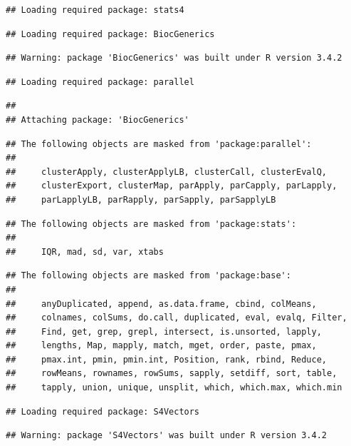 \documentclass[]{article}
\begin{document}
\begin{verbatim}
## Loading required package: stats4
\end{verbatim}

\begin{verbatim}
## Loading required package: BiocGenerics
\end{verbatim}

\begin{verbatim}
## Warning: package 'BiocGenerics' was built under R version 3.4.2
\end{verbatim}

\begin{verbatim}
## Loading required package: parallel
\end{verbatim}

\begin{verbatim}
## 
## Attaching package: 'BiocGenerics'
\end{verbatim}

\begin{verbatim}
## The following objects are masked from 'package:parallel':
## 
##     clusterApply, clusterApplyLB, clusterCall, clusterEvalQ,
##     clusterExport, clusterMap, parApply, parCapply, parLapply,
##     parLapplyLB, parRapply, parSapply, parSapplyLB
\end{verbatim}

\begin{verbatim}
## The following objects are masked from 'package:stats':
## 
##     IQR, mad, sd, var, xtabs
\end{verbatim}

\begin{verbatim}
## The following objects are masked from 'package:base':
## 
##     anyDuplicated, append, as.data.frame, cbind, colMeans,
##     colnames, colSums, do.call, duplicated, eval, evalq, Filter,
##     Find, get, grep, grepl, intersect, is.unsorted, lapply,
##     lengths, Map, mapply, match, mget, order, paste, pmax,
##     pmax.int, pmin, pmin.int, Position, rank, rbind, Reduce,
##     rowMeans, rownames, rowSums, sapply, setdiff, sort, table,
##     tapply, union, unique, unsplit, which, which.max, which.min
\end{verbatim}

\begin{verbatim}
## Loading required package: S4Vectors
\end{verbatim}

\begin{verbatim}
## Warning: package 'S4Vectors' was built under R version 3.4.2
\end{verbatim}
\end{document}
